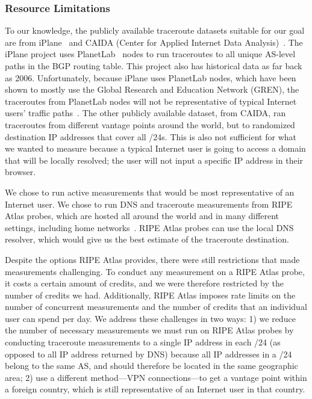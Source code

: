 \subsubsection{Resource Limitations}
\label{resource_limits}
To our knowledge, the publicly available traceroute datasets suitable for our goal are from iPlane~\cite{madhyastha2006iplane} and CAIDA (Center for Applied Internet Data Analysis)~\cite{caida}.  The iPlane project uses PlanetLab~\cite{planetlab} nodes to run traceroutes to all unique AS-level paths in the BGP routing table.  This project also has historical data as far back as 2006.  Unfortunately, because iPlane uses PlanetLab nodes, which have been shown to mostly use the Global Research and Education Network (GREN), the traceroutes from PlanetLab nodes will not be representative of typical Internet users' traffic paths~\cite{banerjee2004interdomain}.  The other publicly available dataset, from CAIDA, ran traceroutes from different vantage points around the world, but to randomized destination IP addresses that cover all /24s.  This is also not sufficient for what we wanted to measure because a typical Internet user is going to access a domain that will be locally resolved; the user will not input a specific IP address in their browser.  

We chose to run active measurements that would be most representative of an Internet user.  We chose to run DNS and traceroute measurements from RIPE Atlas probes, which are hosted all around the world and in many different settings, including home networks~\cite{ripe_atlas}.  RIPE Atlas probes can use the local DNS resolver, which would give us the best estimate of the traceroute destination.

Despite the options RIPE Atlas provides, there were still restrictions that made measurements challenging.  To conduct any measurement on a RIPE Atlas probe, it costs a certain amount of credits, and we were therefore restricted by the number of credits we had.  Additionally, RIPE Atlas imposes rate limits on the number of concurrent measurements and the number of credits that an individual user can spend per day.  We address these challenges in two ways: 1) we reduce the number of necessary measurements we must run on RIPE Atlas probes by conducting traceroute measurements to a single IP address in each /24 (as opposed to all IP address returned by DNS) because all IP addresses in a /24 belong to the same AS, and should therefore be located in the same geographic area; 2) use a different method---VPN connections---to get a vantage point within a foreign country, which is still representative of an Internet user in that country.

